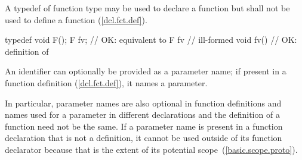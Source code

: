 \pnum
{}%
A typedef of function type may be used to declare a function but shall not be
used to define a function (\ref{dcl.fct.def}).
\begin{example}

\begin{codeblock}
typedef void F();
F  fv;              // OK: equivalent to 
F  fv { }           // ill-formed
void fv() { }       // OK: definition of 
\end{codeblock}
\end{example}

\pnum
An identifier can optionally be provided as a parameter name;
if present in a function definition (\ref{dcl.fct.def}), it names a parameter.
\begin{note}
In particular, parameter names are also optional in function definitions
and names used for a parameter in different declarations and the definition
of a function need not be the same.
If a parameter name is present in a function declaration that is not a definition,
it cannot be used outside of
its function declarator because that is the extent of its potential scope~(\ref{basic.scope.proto}).
\end{note}

